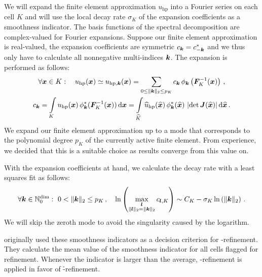 We will expand the finite element approximation $u_\text{hp}$ into a Fourier series on each cell $K$ and will use the local decay rate $\sigma_K$ of the expansion coefficients as a smoothness indicator. The basis functions of the spectral decomposition are complex-valued for Fourier expansions. Suppose our finite element approximation is real-valued, the expansion coefficients are symmetric $c_\tuple{k} = c_{-\tuple{k}}^*$ and we thus only have to calculate all nonnegative multi-indices $\tuple{k}$. The expansion is performed as follows:
\begin{gather}
\forall \vec{x} \in K : \quad u_{\text{hp}}(\vec{x}) \simeq u_{\text{hp}, \tuple{k}}(\vec{x}) = \sum\limits_{0 \leq \|\tuple{k}\|_2 \leq p_K} c_\tuple{k} \, \phi_\tuple{k}\left(\mat{F}_K^{-1}(\vec{x})\right) \,\text{,} \\
c_\tuple{k} =
\int\limits_K u_{\text{hp}}(\vec{x}) \, \phi_\tuple{k}^\ast(\mat{F}_K^{-1}(\vec{x})) \differential{\vec{x}} =
\int\limits_{\widehat{K}} \widehat{u}_{\text{hp}}(\vec{\widehat{x}}) \, \phi_\tuple{k}^\ast(\vec{\widehat{x}}) \, \left|\det \mat{J}(\vec{\widehat{x}})\right| \differential{\vec{\widehat{x}}} \,\text{.}
\end{gather}
We expand our finite element approximation up to a mode that corresponds to the polynomial degree $p_K$ of the currently active finite element. From experience, we decided that this is a suitable choice as results converge from this value on. \textcite{dealiifourier}

With the expansion coefficients at hand, we calculate the decay rate with a least squares fit as follows:
\begin{align}
\forall \tuple{k} \in \mathbb{N}_0^\text{dim} : ~ 0 < \|\tuple{k}\|_2 \leq p_K \,\text{,} \quad \ln\left( \max\limits_{\substack{\tuple{l} \\ \|\tuple{l}\|_2 = \|\tuple{k}\|_2}} c_{\tuple{l}, K} \right) \sim C_K - \sigma_K  \ln\left( \|\tuple{k}\|_2 \right) \,\text{.}
\end{align}
We will skip the zeroth mode to avoid the singularity caused by the logarithm.

\textcite{bangerth2009} originally used these smoothness indicators as a decision criterion for \hp-refinement. They calculate the mean value of the smoothness indicator for all cells flagged for refinement. Whenever the indicator is larger than the average, \p-refinement is applied in favor of \h-refinement.

